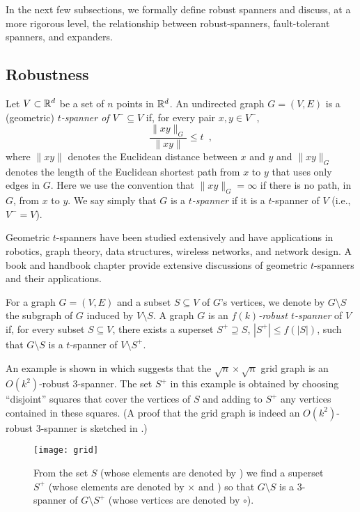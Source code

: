 \documentclass{patmorin}
\begin{document}
In the next few subsections, we formally define robust spanners
and discuss, at a more rigorous level, the relationship between
robust-spanners, fault-tolerant spanners, and expanders.

\subsection{Robustness}

Let $V\subset \mathbb{R}^d$ be a set of $n$ points in $\mathbb{R}^d$.  An undirected
graph $G=(V,E)$ is a (geometric) \emph{$t$-spanner of $V^-\subseteq V$}
if, for every pair $x,y\in V^-$,
\[
  \frac{\|xy\|_G}{\|xy\|} \le t \enspace ,
\]
where $\|xy\|$ denotes the Euclidean distance between $x$ and $y$ and
$\|xy\|_G$ denotes the length of the Euclidean shortest path from $x$
to $y$ that uses only edges in $G$.  Here we use the convention that
$\|xy\|_G=\infty$ if there is no path, in $G$, from $x$ to $y$.  We say
simply that $G$ is a \emph{$t$-spanner} if it is a $t$-spanner of $V$
(i.e., $V^-=V$).

Geometric $t$-spanners have been studied extensively and have applications
in robotics, graph theory, data structures, wireless networks, and network
design.  A book \cite{ns07} and handbook chapter \cite{e99} provide
extensive discussions of geometric $t$-spanners and their applications.

For a graph $G=(V,E)$ and a subset $S\subseteq V$ of $G$'s vertices, we
denote by $G\setminus S$ the subgraph of $G$ induced by $V\setminus S$.
A graph $G$ is an \emph{$f(k)$-robust $t$-spanner} of $V$ if, for every
subset $S\subseteq V$, there exists a superset $S^+\supseteq S$, $|S^+|\le
f(|S|)$, such that $G\setminus S$ is a $t$-spanner of $V\setminus S^+$.

An example is shown in  which suggests that the
$\sqrt{n}\times\sqrt{n}$ grid graph is an $O(k^2)$-robust 3-spanner.
The set $S^+$ in this example is obtained by choosing ``disjoint''
squares that cover the vertices of $S$ and adding to $S^+$ any vertices
contained in these squares.  (A proof that the grid graph is indeed an
$O(k^2)$-robust 3-spanner is sketched in .)

\begin{figure}
  \begin{center}
    \texttt{[image: grid]}
  \end{center}
  \caption{From the set $S$ (whose elements are denoted by \textbullet)
  we find a superset $S^+$ (whose elements are denoted by $\times$ and
  \textbullet) so that $G\setminus S$ is a 3-spanner of $G\setminus S^+$
  (whose vertices are denoted by $\circ$).}
\end{figure}
\end{document}
